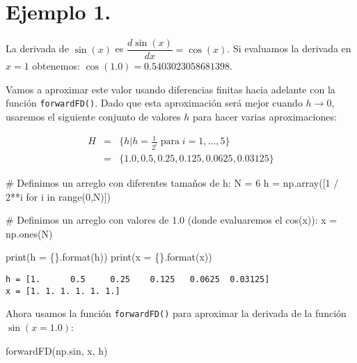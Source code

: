 \documentclass[
  letterpaper,
  DIV=11,
  numbers=noendperiod]{scrreprt}
\newenvironment{Shaded}{\begin{snugshade}}{\end{snugshade}}
\newcommand{\BuiltInTok}[1]{\textcolor[rgb]{0.00,0.23,0.31}{#1}}
\newcommand{\CommentTok}[1]{\textcolor[rgb]{0.37,0.37,0.37}{#1}}
\newcommand{\ControlFlowTok}[1]{\textcolor[rgb]{0.00,0.23,0.31}{#1}}
\newcommand{\DecValTok}[1]{\textcolor[rgb]{0.68,0.00,0.00}{#1}}
\newcommand{\KeywordTok}[1]{\textcolor[rgb]{0.00,0.23,0.31}{#1}}
\newcommand{\NormalTok}[1]{\textcolor[rgb]{0.00,0.23,0.31}{#1}}
\newcommand{\OperatorTok}[1]{\textcolor[rgb]{0.37,0.37,0.37}{#1}}
\newcommand{\SpecialCharTok}[1]{\textcolor[rgb]{0.37,0.37,0.37}{#1}}
\newcommand{\StringTok}[1]{\textcolor[rgb]{0.13,0.47,0.30}{#1}}
\begin{document}
\section{Ejemplo 1.}\label{ejemplo-1.}

La derivada de \(\sin(x)\) es \(\dfrac{d \sin(x)}{d x} = \cos(x)\). Si
evaluamos la derivada en \(x=1\) obtenemos:
\(\cos(1.0) = 0.5403023058681398\).

Vamos a aproximar este valor usando diferencias finitas hacia adelante
con la función \texttt{forwardFD()}. Dado que esta aproximación será
mejor cuando \(h \to 0\), usaremos el siguiente conjunto de valores
\(h\) para hacer varias aproximaciones:

\[
\begin{eqnarray*}
H & = & \{h|h = \frac{1}{2^i} \; \text{para} \; i = 1,\dots,5 \} \\
  & = & \{1.0, 0.5, 0.25, 0.125, 0.0625, 0.03125 \}
\end{eqnarray*}
\]

\begin{Shaded}
\begin{Highlighting}[]
\CommentTok{\# Definimos un arreglo con diferentes tamaños de h:}
\NormalTok{N }\OperatorTok{=} \DecValTok{6}
\NormalTok{h }\OperatorTok{=}\NormalTok{ np.array([}\DecValTok{1} \OperatorTok{/} \DecValTok{2}\OperatorTok{**}\NormalTok{i }\ControlFlowTok{for}\NormalTok{ i }\KeywordTok{in} \BuiltInTok{range}\NormalTok{(}\DecValTok{0}\NormalTok{,N)])}

\CommentTok{\# Definimos un arreglo con valores de 1.0 (donde evaluaremos el cos(x)):}
\NormalTok{x }\OperatorTok{=}\NormalTok{ np.ones(N)}

\BuiltInTok{print}\NormalTok{(}\StringTok{\textquotesingle{}h = }\SpecialCharTok{\{\}}\StringTok{\textquotesingle{}}\NormalTok{.}\BuiltInTok{format}\NormalTok{(h))}
\BuiltInTok{print}\NormalTok{(}\StringTok{\textquotesingle{}x = }\SpecialCharTok{\{\}}\StringTok{\textquotesingle{}}\NormalTok{.}\BuiltInTok{format}\NormalTok{(x))}
\end{Highlighting}
\end{Shaded}

\begin{verbatim}
h = [1.      0.5     0.25    0.125   0.0625  0.03125]
x = [1. 1. 1. 1. 1. 1.]
\end{verbatim}

Ahora usamos la función \texttt{forwardFD()} para aproximar la derivada
de la función \(\sin(x=1.0)\):

\begin{Shaded}
\begin{Highlighting}[]
\NormalTok{forwardFD(np.sin, x, h)}
\end{Highlighting}
\end{Shaded}
\end{document}
